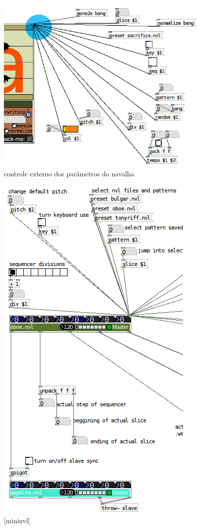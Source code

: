 \documentclass{ppgmus}
\begin{document}
\begin{figure}
\includegraphics[scale=.6]{controls-nvl}
\caption{controle externo dos parâmetros do navalha}
\label{control-nvl}
\end{figure}

\begin{figure}
\includegraphics[scale=.6]{mininvl}
\caption{[mininvl]}
\label{mininvl}
\end{figure}
\end{document}
